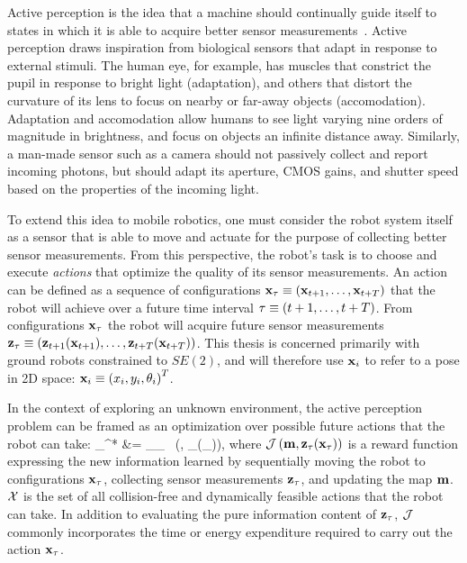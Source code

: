 Active perception is the idea that a machine should continually guide itself to states in
which it is able to acquire better sensor measurements~\cite{bajcsy1988active,bajcsy1992active}.
Active perception draws inspiration from biological sensors that adapt in
response to external stimuli. The human eye, for example, has muscles that
constrict the pupil in response to bright light (adaptation), and others that distort the
curvature of its lens to focus on nearby or far-away objects (accomodation).
Adaptation and accomodation allow humans to see light varying nine orders of
magnitude in brightness, and focus on objects an infinite distance away.
Similarly, a man-made sensor such as a camera should not passively collect and report incoming photons,
but should adapt its aperture, CMOS gains, and shutter speed based on the
properties of the incoming light.

To extend this idea to mobile robotics, one must consider the robot system itself as
a sensor that is able to move and actuate for the purpose of collecting better
sensor measurements. From this perspective, the robot's task is to choose and
execute \textit{actions} that optimize the quality of its sensor measurements.
An action can be defined as a sequence of configurations
$\mathbf{x}_{\mathbf{\tau}}\equiv \left(\mathbf{x}_{t+1}, \dots, \mathbf{x}_{t+T}\right)$
that the robot will achieve
over a future time interval $\mathbf{\tau}\equiv (t+1,\dots,t+T)$. From configurations
$\mathbf{x}_{\mathbf{\tau}}$ the robot will acquire future sensor measurements
$\mathbf{z}_{\mathbf{\tau}} \equiv
\left(\mathbf{z}_{t+1}(\mathbf{x}_{t+1}), \dots, \mathbf{z}_{t+T}(\mathbf{x}_{t+T})\right)$. This thesis is
concerned primarily with ground robots constrained to $SE(2)$, and will
therefore use $\mathbf{x}_{i}$ to refer to a pose in 2D space: $\mathbf{x}_{i}\equiv
\left(x_{i}, y_{i}, \theta_{i}\right)^{T}$.

In the context of exploring an unknown environment, the active perception problem can
be framed as an optimization over possible future actions that the robot can take:
%
\eq
{
  _{\mbf{\tau}}^{*}
  &=
  \argmax_{_{\mbf{\tau}} \in {}}
  \ \left(, _{\mbf{\tau}}(_{\mbf{\tau}})\right),
  \label{eq:active_perception}
}
%
where $\mathcal{J}\left(\mathbf{m}, \mathbf{z}_{\mathbf{\tau}}(\mathbf{x}_{\mathbf{\tau}})\right)$ is a reward
function expressing the new information learned by sequentially moving the robot
to configurations $\mathbf{x}_{\mathbf{\tau}}$, collecting sensor measurements
$\mathbf{z}_{\mathbf{\tau}}$, and updating the map $\mathbf{m}$. $\mathcal{X}$ is the set of all collision-free
and dynamically feasible actions that the robot can take. In addition to
evaluating the pure information content of $\mathbf{z}_{\mathbf{\tau}}$, $\mathcal{J}$ commonly
incorporates the time or energy expenditure required to carry out the
action $\mathbf{x}_{\mathbf{\tau}}$.

